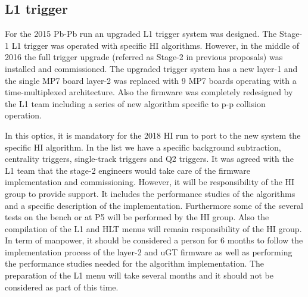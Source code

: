 \subsection{L1 trigger\label{subsec:L1Trigger}}
For the 2015 Pb-Pb run an upgraded L1 trigger system was designed. The Stage-1 L1 trigger was operated with specific HI algorithms. However, in the middle of 2016 the full trigger upgrade (referred as Stage-2 in previous proposals) was installed and commissioned. The upgraded trigger system has a new layer-1 and the single MP7 board layer-2 was replaced with 9 MP7 boards operating with a time-multiplexed architecture. Also the firmware was completely redesigned by the L1 team including a series of new algorithm specific to p-p collision operation. 

In this optics, it is mandatory for the 2018 HI run to port to the new system the specific HI algorithm. In the list we have a specific background subtraction, centrality triggers, single-track triggers and Q2 triggers. It was agreed with the L1 team that the stage-2 engineers would take care of the firmware implementation and commissioning. However, it will be responsibility of the HI group to provide support. It includes the performance studies of the algorithms and a specific description of the implementation. Furthermore some of the several tests on the bench or at P5 will be performed by the HI group. Also the compilation of the L1 and HLT menus will remain responsibility of the HI group. In term of manpower, it should be considered a person for 6 months to follow the implementation process of the layer-2 and uGT firmware as well as performing the performance studies needed for the algorithm implementation. The preparation of the L1 menu will take several months and it should not be considered as part of this time. 
